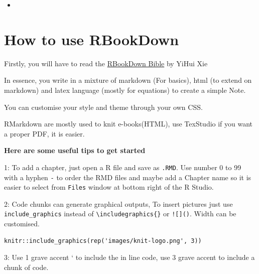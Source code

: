 \documentclass[
]{book}
\providecommand{\tightlist}{%
  \setlength{\itemsep}{0pt}\setlength{\parskip}{0pt}}
\begin{document}
\begin{itemize}
\tightlist
\item
\end{itemize}

\chapter*{How to use RBookDown}\label{how-to-use-rbookdown}

Firstly, you will have to read the \href{https://bookdown.org/yihui/bookdown/}{RBookDown Bible} by YiHui Xie

In essence, you write in a mixture of markdown (For basics), html (to extend on markdown) and latex language (mostly for equations) to create a simple Note.

You can customise your style and theme through your own CSS.

RMarkdown are mostly used to knit e-books(HTML), use TexStudio if you want a proper PDF, it is easier.

\textbf{Here are some useful tips to get started}

1: To add a chapter, just open a R file and save as \texttt{.RMD}. Use number 0 to 99 with a hyphen \texttt{-} to order the RMD files and maybe add a Chapter name so it is easier to select from \texttt{Files} window at bottom right of the R Studio.

2: Code chunks can generate graphical outputs, To insert pictures just use \texttt{include\_graphics} instead of \texttt{\textbackslash{}includegraphics\{\}} or \texttt{!{[}{]}()}. Width can be customised.

\begin{verbatim}
knitr::include_graphics(rep('images/knit-logo.png', 3))
\end{verbatim}

3: Use 1 grave accent ` to include the in line code, use 3 grave accent to include a chunk of code.

  
\end{document}
